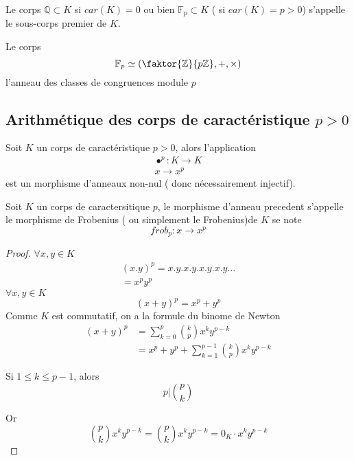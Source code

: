 \documentclass[../main.tex]{subfiles}
\begin{document}
\begin{defn}
	Le corps $ \mathbb{Q} \subset K$ si $car(K) = 0$ ou bien $\mathbb{F}_p \subset K$ ( si $car(K)=p > 0$) s'appelle le sous-corps premier de $K$.
\end{defn}
\begin{rmq}
Le corps
\[ 
	\mathbb{F}_p \simeq ( \faktor{\mathbb{Z}}{p \mathbb{Z}}, + ,\times)
\]
l'anneau des classes de congruences module $p$
\end{rmq}
\subsection{Arithmétique des corps de caractéristique $p>0$}
\begin{propo}
Soit $K$ un corps de caractéristique $p>0$, alors l'application
\begin{align*}
\bullet^{p}: K \to K\\
x \to x^{p}
\end{align*}
est un morphisme d'anneaux non-nul ( donc nécessairement injectif).
\end{propo}
\begin{defn}
	Soit $K$ un corps de caractersitique $p$, le morphisme d'anneau precedent s'appelle le morphisme de Frobenius ( ou simplement le Frobenius)de $K$ se note
	\[ 
	frob_p: x \to x^{p}
	\]
\end{defn}
\begin{proof}
$\forall x, y \in K$
\begin{align*}
( x.y)^{p} = x.y.x.y.x.y.x.y \ldots\\
= x^{p} y^{p}
\end{align*}
$\forall x,y \in K$ 
\[ 
	( x+y)^{p} = x^{p} + y^{p}
\]
Comme $K$ est commutatif, on a la formule du binome de Newton
\begin{align*}
	( x+y)^{p} &= \sum_{k=0}^{ p} \binom{k}{p} x^{k} y ^{p-k}\\
&= x^{p} + y^{p} + \sum_{k=1}^{ p-1}\binom{k}{p} x^{k} y^{p-k}
\end{align*}
\begin{lemma}
Si $1 \leq k \leq p-1$, alors
\[ 
	p | \binom{p}{k}
\]

\end{lemma}
Or
\[ 
	\binom{p}{k} x^{k} y^{p-k} = \binom{p}{k}x^{k} y^{p-k} = 0_K \cdot x^{k} y^{p-k}
\]

\end{proof}
\end{document}
